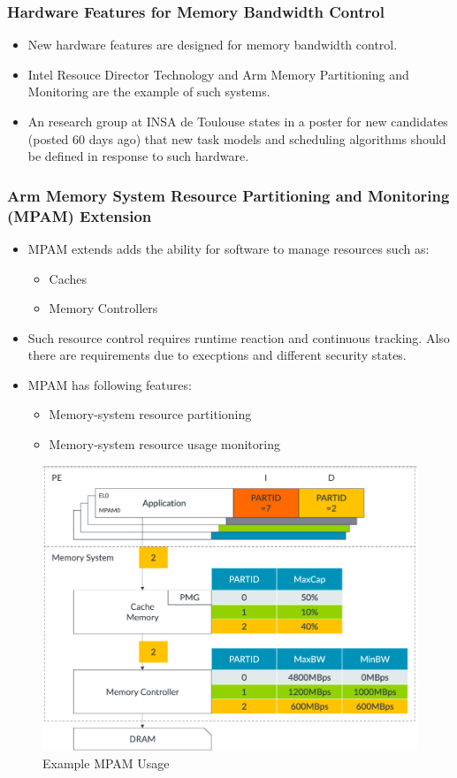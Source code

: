 \documentclass{beamer}
\begin{document}
\begin{frame}
    \frametitle{Hardware Features for Memory Bandwidth Control}
    \begin{itemize}
        \item New hardware features are designed for memory bandwidth control.
        \item Intel Resouce Director Technology and Arm Memory Partitioning
            and Monitoring are the example of such systems.
        \item An research group at INSA de Toulouse states in a poster for new
            candidates (posted 60 days ago) that new task models and scheduling
            algorithms should be defined in response to such hardware.
    \end{itemize}
\end{frame}
\begin{frame}
    \frametitle{Arm Memory System Resource Partitioning and Monitoring (MPAM)
    Extension}
    \begin{itemize}
        \item MPAM extends adds the ability for software to manage resources
            such as:
            \begin{itemize}
                \item Caches
                \item Memory Controllers
            \end{itemize}
        \item Such resource control requires runtime reaction and continuous
            tracking. Also there are requirements due to execptions and
            different security states.
        \item MPAM has following features:
            \begin{itemize}
                \item Memory-system resource partitioning
                \item Memory-system resource usage monitoring
            \end{itemize}
    \end{itemize}
\end{frame}
\begin{frame}
    \begin{figure}
        \centering
        \includegraphics[width=0.80\columnwidth]{mpam.png}
        \caption{Example MPAM Usage}
        \label{fig:MPAM}
    \end{figure}
\end{frame}
\end{document}
